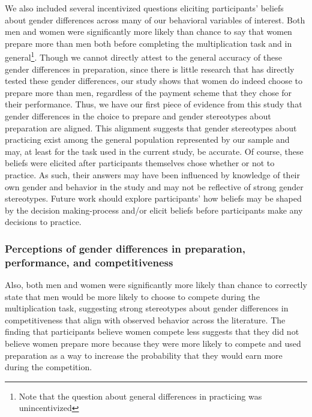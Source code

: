 \documentclass[letterpaper, nobind]{templates/ociamthesis}
\begin{document}
We also included several incentivized questions eliciting participants' beliefs about gender differences across many of our behavioral variables of interest. Both men and women were significantly more likely than chance to say that women prepare more than men both before completing the multiplication task and in general\footnote{Note that the question about general differences in practicing was unincentivized}. Though we cannot directly attest to the general accuracy of these gender differences in preparation, since there is little research that has directly tested these gender differences, our study shows that women do indeed choose to prepare more than men, regardless of the payment scheme that they chose for their performance. Thus, we have our first piece of evidence from this study that gender differences in the choice to prepare and gender stereotypes about preparation are aligned. This alignment suggests that gender stereotypes about practicing exist among the general population represented by our sample and may, at least for the task used in the current study, be accurate. Of course, these beliefs were elicited after participants themselves chose whether or not to practice. As such, their answers may have been influenced by knowledge of their own gender and behavior in the study and may not be reflective of strong gender stereotypes. Future work should explore participants' how beliefs may be shaped by the decision making-process and/or elicit beliefs before participants make any decisions to practice.

\hypertarget{perceptions-of-gender-differences-in-preparation-performance-and-competitiveness-1}{%
\subsubsection{Perceptions of gender differences in preparation, performance, and competitiveness}\label{perceptions-of-gender-differences-in-preparation-performance-and-competitiveness-1}}

Also, both men and women were significantly more likely than chance to correctly state that men would be more likely to choose to compete during the multiplication task, suggesting strong stereotypes about gender differences in competitiveness that align with observed behavior across the literature. The finding that participants believe women compete less suggests that they did not believe women prepare more because they were more likely to compete and used preparation as a way to increase the probability that they would earn more during the competition.
\end{document}
